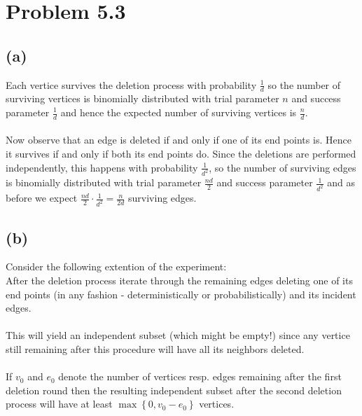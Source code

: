 \section*{Problem 5.3}
\subsection*{(a)}

Each vertice survives the deletion process with probability $\frac{1}{d}$
so the number of surviving vertices is binomially distributed 
with trial parameter $n$ and success parameter $\frac{1}{d}$ and hence the expected number of surviving vertices
is $\frac{n}{d}$. \\ \\
Now observe that an edge is deleted if and only if one of its end points is. 
Hence it survives if and only if both its end points do. 
Since the deletions are performed independently, this happens with probability $\frac{1}{d^2}$,
so the number of surviving edges is binomially distributed
with trial parameter $\frac{nd}{2}$ and success parameter $\frac{1}{d^2}$ and as before we expect
$\frac{nd}{2}\cdot \frac{1}{d^2}=\frac{n}{2d}$ surviving edges.

\subsection*{(b)}
Consider the following extention of the experiment: \\
After the deletion process iterate through the remaining edges
deleting one of its end points (in any fashion - deterministically or probabilistically)
and its incident edges. \\ \\
This will yield an independent subset (which might be empty!) 
since any vertice still remaining after this procedure will have all its neighbors deleted. \\ \\
If $v_0$ and $e_0$ denote the number of vertices resp. edges remaining after the first deletion round
then the resulting independent subset after the second deletion process will have at least
$\max\left\{ 0, v_0-e_0 \right\}$ vertices.
